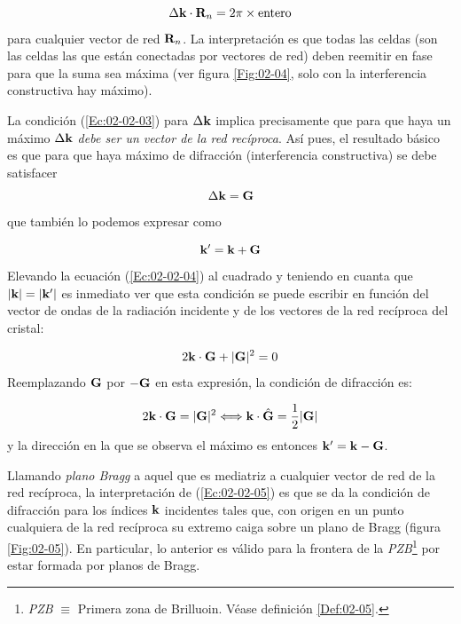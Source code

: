 \begin{equation}
    \Delta \mathbf{k} \cdot \mathbf{R}_n = 2 \pi \times \text{entero} \label{Ec:02-02-03}
\end{equation}
para cualquier vector de red $\mathbf{R}_n$. La interpretación es que todas las celdas (son las celdas las que están conectadas por vectores de red) deben reemitir en fase para que la suma sea máxima (ver figura \ref{Fig:02-04}, solo con la interferencia constructiva hay máximo).    


La condición (\ref{Ec:02-02-03}) para $\Delta \mathbf{k}$ implica precisamente que para que haya un máximo $\Delta \mathbf{k}$ \textit{debe ser un vector de la red recíproca}. Así pues, el resultado básico es que para que haya máximo de difracción (interferencia constructiva) se debe satisfacer 
\begin{equation}
    \Delta \mathbf{k} = \mathbf{G}\label{Ec:02-02-04}
\end{equation}
que también lo podemos expresar como 

\begin{equation*}
	\mathbf{k}' = \mathbf{k} + \mathbf{G}
\end{equation*}
Elevando la ecuación (\ref{Ec:02-02-04}) al cuadrado y teniendo en cuanta que $|\mathbf{k}|=|\mathbf{k}'|$ es inmediato ver que esta condición se puede escribir en función del vector de ondas de la radiación incidente y de los vectores de la red recíproca del cristal: 

\begin{equation*}
	2\mathbf{k} \cdot \mathbf{G} + |\mathbf{G}|^2 = 0
\end{equation*}
Reemplazando $\mathbf{G}$ por $-\mathbf{G}$ en esta expresión, la condición de difracción es: 

\begin{equation}
    2 \mathbf{k} \cdot \mathbf{G} = |\mathbf{G}|^2 \Longleftrightarrow \mathbf{k} \cdot \hat{\mathbf{G}} = \frac{1}{2} |\mathbf{G}| \label{Ec:02-02-05}
\end{equation}
y la dirección en la que se observa el máximo es entonces $\mathbf{k}'=\mathbf{k}-\mathbf{G}$. 



Llamando \textit{plano Bragg} a aquel que es mediatriz a cualquier vector de red de la red recíproca, la interpretación de (\ref{Ec:02-02-05}) es que se da la condición de difracción para los índices $\mathbf{k}$ incidentes tales que, con origen en un punto cualquiera de la red recíproca su extremo caiga sobre un plano de Bragg (figura \ref{Fig:02-05}). En particular, lo anterior es válido para la frontera de la \textit{PZB}\footnote{\textit{PZB} $\equiv$ Primera zona de Brilluoin. Véase definición \ref{Def:02-05}.} por estar formada por planos de Bragg. 

